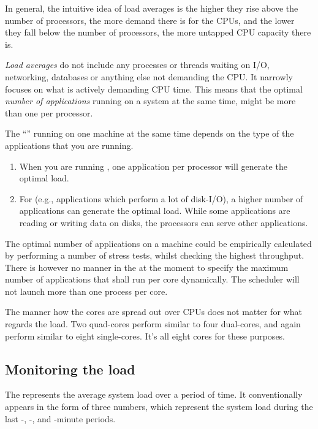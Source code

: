 In general, the intuitive idea of load averages is the higher they rise above
the number of processors, the more demand there is for the CPUs, and the lower
they fall below the number of processors, the more untapped CPU capacity there
is.

\emph{Load averages} do not include any processes or threads waiting on I/O,
networking, databases or anything else not demanding the CPU. It narrowly
focuses on what is actively demanding CPU time. This means that the optimal
\emph{number of applications} running on a system at the same time, might be
more than one per processor.

The ``'' running on one machine at the
same time depends on the type of the applications that you are running.

\begin{enumerate}
\item  When you are running , one
  application per processor will generate the optimal load.
\item  For  (e.g., applications which perform
  a lot of disk-I/O), a higher number of applications can generate the optimal
  load. While some applications are reading or writing data on disks, the
  processors can serve other applications.
\end{enumerate}

The optimal number of applications on a machine could be empirically calculated
by performing a number of stress tests, whilst checking the highest throughput.
There is however no manner in the \hpc at the moment to specify the maximum
number of applications that shall run per core dynamically. The \hpc scheduler
will not launch more than one process per core.

The manner how the cores are spread out over CPUs does not matter for what
regards the load. Two quad-cores perform similar to four dual-cores, and again
perform similar to eight single-cores. It's all eight cores for these purposes.

\subsection{Monitoring the load}

The  represents the average system load over a period of
time. It conventionally appears in the form of three numbers, which represent
the system load during the last -, -, and
-minute periods.

